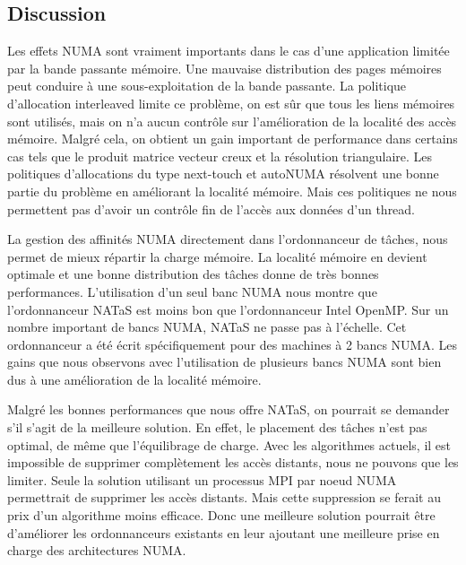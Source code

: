 \subsection{Discussion}
Les effets NUMA sont vraiment importants dans le cas d'une application limitée par la bande passante mémoire.
%
Une mauvaise distribution des pages mémoires peut conduire à une sous-exploitation de la bande passante.
%
La politique d'allocation interleaved limite ce problème, on est sûr que tous les liens mémoires sont utilisés, mais on n'a aucun contrôle sur l'amélioration de la localité des accès mémoire.
%
Malgré cela, on obtient un gain important de performance dans certains cas tels que le produit matrice vecteur creux et la résolution triangulaire.
%
Les politiques d'allocations du type next-touch et autoNUMA résolvent une bonne partie du problème en améliorant la localité mémoire.
%
Mais ces politiques ne nous permettent pas d'avoir un contrôle fin de l'accès aux données d'un thread.

La gestion des affinités NUMA directement dans l'ordonnanceur de tâches, nous permet de mieux répartir la charge mémoire.
%
La localité mémoire en devient optimale et une bonne distribution des tâches donne de très bonnes performances.
%
L'utilisation d'un seul banc NUMA nous montre que l'ordonnanceur NATaS est moins bon que l'ordonnanceur Intel OpenMP.
%
Sur un nombre important de bancs NUMA, NATaS ne passe pas à l'échelle.
%
Cet ordonnanceur a été écrit spécifiquement pour des machines à 2 bancs NUMA.
%
Les gains que nous observons avec l'utilisation de plusieurs bancs NUMA sont bien dus à une amélioration de la localité mémoire.

Malgré les bonnes performances que nous offre NATaS, on pourrait se demander s'il s'agit de la meilleure solution.
%
En effet, le placement des tâches n'est pas optimal, de même que l'équilibrage de charge.
%
Avec les algorithmes actuels, il est impossible de supprimer complètement les accès distants, nous ne pouvons que les limiter.
%
Seule la solution utilisant un processus MPI par noeud NUMA permettrait de supprimer les accès distants.
%
Mais cette suppression se ferait au prix d'un algorithme moins efficace.
%
Donc une meilleure solution pourrait être d'améliorer les ordonnanceurs existants en leur ajoutant une meilleure prise en charge des architectures NUMA.

